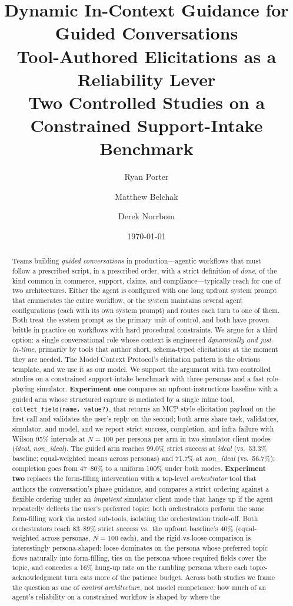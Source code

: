 \documentclass[11pt,a4paper]{article}
\title{Dynamic In-Context Guidance for Guided Conversations\\
Tool-Authored Elicitations as a Reliability Lever\\
\large Two Controlled Studies on a Constrained Support-Intake Benchmark}
\author{Ryan Porter \and Matthew Belchak \and Derek Norrbom}
\date{\today}
\newcommand{\rerunPlaceholderN}{100}
\begin{document}
\maketitle

\begin{abstract}
Teams building \emph{guided conversations} in production---agentic workflows that must follow a prescribed script, in a prescribed order, with a strict definition of \emph{done}, of the kind common in commerce, support, claims, and compliance---typically reach for one of two architectures. Either the agent is configured with one long upfront system prompt that enumerates the entire workflow, or the system maintains several agent configurations (each with its own system prompt) and routes each turn to one of them. Both treat the system prompt as the primary unit of control, and both have proven brittle in practice on workflows with hard procedural constraints. We argue for a third option: a single conversational role whose context is engineered \emph{dynamically and just-in-time}, primarily by tools that author short, schema-typed elicitations at the moment they are needed. The Model Context Protocol's elicitation pattern is the obvious template, and we use it as our model. We support the argument with two controlled studies on a constrained support-intake benchmark with three personas and a fast role-playing simulator. \textbf{Experiment one} compares an upfront-instructions baseline with a guided arm whose structured capture is mediated by a single inline tool, \texttt{collect\_field(name, value?)}, that returns an MCP-style elicitation payload on the first call and validates the user's reply on the second; both arms share task, validators, simulator, and model, and we report strict success, completion, and infra failure with Wilson 95\% intervals at $N=\rerunPlaceholderN$ per persona per arm in two simulator client modes (\emph{ideal}, \emph{non\_ideal}). The guided arm reaches 99.0\% strict success at \emph{ideal} (vs.\ 53.3\% baseline; equal-weighted means across personas) and 71.7\% at \emph{non\_ideal} (vs.\ 56.7\%); completion goes from 47--80\% to a uniform 100\% under both modes. \textbf{Experiment two} replaces the form-filling intervention with a top-level \emph{orchestrator} tool that authors the conversation's phase guidance, and compares a strict ordering against a flexible ordering under an \emph{impatient} simulator client mode that hangs up if the agent repeatedly deflects the user's preferred topic; both orchestrators perform the same form-filling work via nested sub-tools, isolating the orchestration trade-off. Both orchestrators reach 83--89\% strict success vs.\ the upfront baseline's 40\% (equal-weighted across personas, $N=\rerunPlaceholderN$ each), and the rigid-vs-loose comparison is interestingly persona-shaped: loose dominates on the persona whose preferred topic flows naturally into form-filling, ties on the persona whose required fields cover the topic, and concedes a 16\% hung-up rate on the rambling persona where each topic-acknowledgment turn eats more of the patience budget. Across both studies we frame the question as one of \emph{control architecture}, not model competence: how much of an agent's reliability on a constrained workflow is shaped by where the 
\end{abstract}
\end{document}
